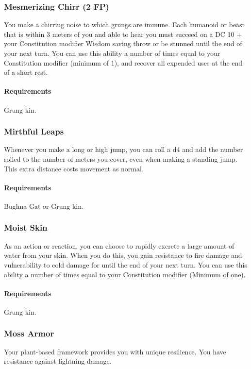 \subsubsection{Mesmerizing Chirr (2 FP)} \label{feat::mesmerizingchirr}
    You make a chirring noise to which grungs are immune.
    Each humanoid or beast that is within 3 meters of you and able to hear you must succeed on a DC 10 + your Constitution modifier Wisdom saving throw or be stunned until the end of your next turn.
    You can use this ability a number of times equal to your Constitution modifier (minimum of 1), and recover all expended uses at the end of a short rest.
    \paragraph{Requirements} Grung kin.
\subsubsection{Mirthful Leaps} \label{feat::mirthfulleaps}
    Whenever you make a long or high jump, you can roll a d4 and add the number rolled to the number of meters you cover, even when making a standing jump.
    This extra distance costs movement as normal.
    \paragraph{Requirements} Bughna Gat or Grung kin.
\subsubsection{Moist Skin} \label{feat::moistskin}
    As an action or reaction, you can choose to rapidly excrete a large amount of water from your skin.
    When you do this, you gain resistance to fire damage and vulnerability to cold damage for until the end of your next turn.
    You can use this ability a number of times equal to your Constitution modifier (Minimum of one).
    \paragraph{Requirements} Grung kin.
\subsubsection{Moss Armor} \label{feat::mossarmor}
    Your plant-based framework provides you with unique resilience.
    You have resistance against lightning damage.
